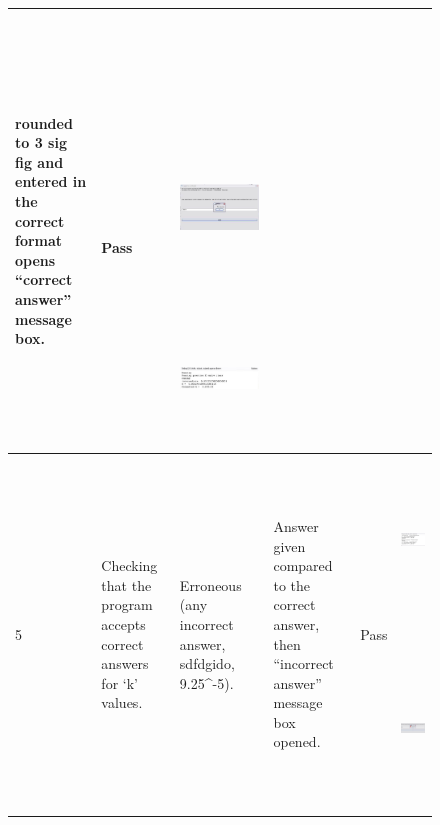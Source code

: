 \documentclass[letterpaper]{article}
\begin{document}
\begin{figure}[hbp]
\begin{minipage}{12.1146in}
\begin{flushleft}
\begin{supertabular}{|m{0.8913598in}|m{1.0997599in}|m{3.3018599in}|m{0.8809598in}|m{0.6198598in}|m{4.84626in}|}
{\color{black} rounded to 3 sig fig and entered in the correct format opens ``correct answer'' message box.} &
{\color{black} ~}

{\color{black} Pass} &
{\color{black} ~}

{\color{black} ~}

 \includegraphics[width=4.0626in,height=2.3543in]{Tests_files/image006.jpg} 
 \includegraphics[width=4.0626in,height=1.1146in]{Tests_files/image007.jpg} \\\hline
{\color{black} 5} &
{\color{black} Checking that the program accepts correct answers for `k' values.} &
{\color{black} Erroneous (any incorrect answer, sdfdgido, 9.25\^{}-5).} &
{\color{black} Answer given compared to the correct answer, then ``incorrect answer'' message box opened.} &
{\color{black} Pass} &
{\color{black}  \includegraphics[width=3.0626in,height=1.7398in]{Tests_files/image008.jpg} ~
\includegraphics[width=3.8543in,height=1.6772in]{Tests_files/image009.jpg} 
}
\end{supertabular}
\end{flushleft}
\end{minipage}
\end{figure}
\end{document}
